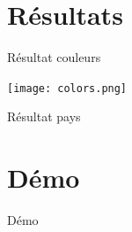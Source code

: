 \documentclass[11pt]{beamer}
\begin{document}
\section{Résultats}
\begin{frame}{Résultat couleurs}
\begin{center}

\texttt{[image: colors.png]} 
\end{center}

\end{frame}

\begin{frame}{Résultat pays}

\end{frame}

\section{Démo}
\begin{frame}{Démo}
\end{frame}
\end{document}
